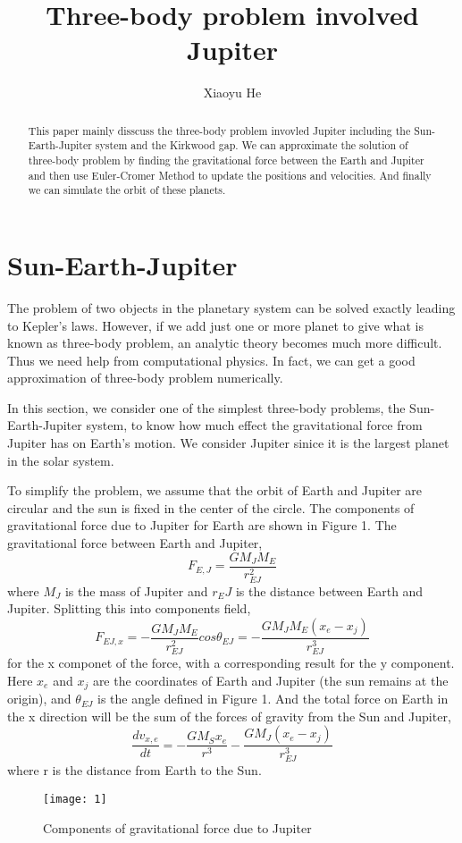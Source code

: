 \documentclass{article}
\begin{document}
\title{Three-body problem involved Jupiter}
\author{Xiaoyu He}
\maketitle

\begin{abstract}
This paper mainly disscuss the three-body problem invovled Jupiter including the Sun-Earth-Jupiter system and the Kirkwood gap. We can approximate the solution of three-body problem by finding the gravitational force between the Earth and Jupiter and then use Euler-Cromer Method to update the positions and velocities. And finally we can simulate the orbit of these planets.
\end{abstract}
\section*{Sun-Earth-Jupiter}

The problem of two objects in the planetary system can be solved exactly leading to Kepler's laws. However, if we add just one or more planet to give what is known as three-body problem, an analytic theory becomes much more difficult. Thus we need help from  computational physics. In fact, we can get a good approximation of three-body problem numerically.

In this section, we consider one of the simplest three-body problems, the Sun-Earth-Jupiter system, to know how much effect the gravitational force from Jupiter has on Earth's motion. We consider Jupiter sinice it is the largest planet in the solar system.

To simplify the problem, we assume that the orbit of Earth and Jupiter are circular and the sun is fixed in the center of the circle. The components of gravitational force due to Jupiter for Earth are shown in Figure 1. The gravitational force between Earth and Jupiter,
\[
F_{E,J}=\frac{GM_JM_E}{r_{EJ}^2}
\]
where $M_J$ is the mass of Jupiter and $r_EJ$ is the distance between Earth and Jupiter. Splitting this into components field,
\[
F_{EJ,x}=-\frac{GM_JM_E}{r_{EJ}^2}cos\theta_{EJ}=-\frac{GM_JM_E(x_e-x_j)}{r_{EJ}^3}
\]
for the x componet of the force, with a corresponding result for the y component. Here $x_e$ and $x_j$ are the coordinates of Earth and Jupiter (the sun remains at the origin), and $\theta_{EJ}$ is the angle defined in Figure 1. And the total force on Earth in the x direction will be the sum of the forces of gravity from the Sun and Jupiter,
\[
\frac{dv_{x,e}}{dt}=-\frac{GM_Sx_e}{r^3}-\frac{GM_J(x_e-x_j)}{r_{EJ}^3}
\]
where r is the distance from Earth to the Sun.
\begin{figure}
\centering
\texttt{[image: 1]} 
\caption{Components of gravitational force due to Jupiter}
\label{Fig:1} 
\end{figure}
\end{document}
